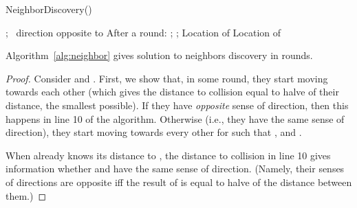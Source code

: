 \begin{algorithm}[]
	\caption{NeighborDiscovery()}
	\label{alg:neighbor}
	\begin{algorithmic}[1]
    \State ;  
    \For{}
        \For{}
            \For{}
                \If{} 
                \Else   \  direction opposite to  \EndIf
                \State \SingleRound
                \State After a round:  \EndFor
        \EndFor
    \EndFor
    \State  {}
    \State \SingleRound;  \State 
    \State \SingleRound;  \State Location of 
    \State Location of 
    \end{algorithmic}
\end{algorithm}

\begin{proposition}\label{p:alg1}
Algorithm~\ref{alg:neighbor} gives solution to neighbors discovery in  rounds.
\end{proposition}
\iffull
\begin{proof}
Consider  and . First, we show that, in some round,
they start moving towards each other (which gives the distance to collision
equal to halve of their distance, the smallest possible). If they have {\em opposite} sense of direction,
then this happens in line 10 of the algorithm. Otherwise (i.e., they have the
same sense of direction), they start moving towards every other for such 
that ,  and .

When  already knows its distance to , the distance to collision
in line 10 gives information whether  and  have the same sense of direction.
(Namely, their senses of directions are opposite iff the result of  is equal to halve of
the distance between them.)
\end{proof}
\else
\fi



